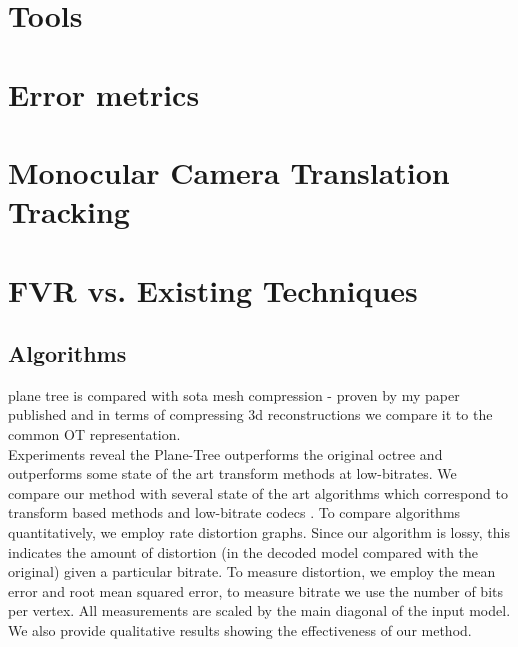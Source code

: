 \section{Tools}
\label{ToolsSection}


\section{Error metrics}
\label{metricsSection}





\section{Monocular Camera Translation Tracking}
\label{Sec:MonocularExperimentsSection}

\section{FVR vs. Existing Techniques}
\subsection{Algorithms} \label{AlgorithmsSection} 




plane tree is compared with sota mesh compression - proven by my paper published and in terms of compressing 3d reconstructions we compare it to the common OT representation. \\

Experiments reveal the Plane-Tree outperforms the original octree and outperforms some state of the art transform methods at low-bitrates. We compare our method with several state of the art algorithms which correspond to transform based methods \cite{Khodakovsky00Progressive,Bayazit103DMesh} and low-bitrate codecs \cite{Peng10Feature}. To compare algorithms quantitatively, we employ rate distortion graphs. Since our algorithm is lossy, this indicates the amount of distortion (in the decoded model compared with the original) given a particular bitrate. To measure distortion, we employ the mean error and root mean squared error, to measure bitrate we use the number of bits per vertex. All measurements are scaled by the main diagonal of the input model. We also provide qualitative results showing the effectiveness of our method. \\

